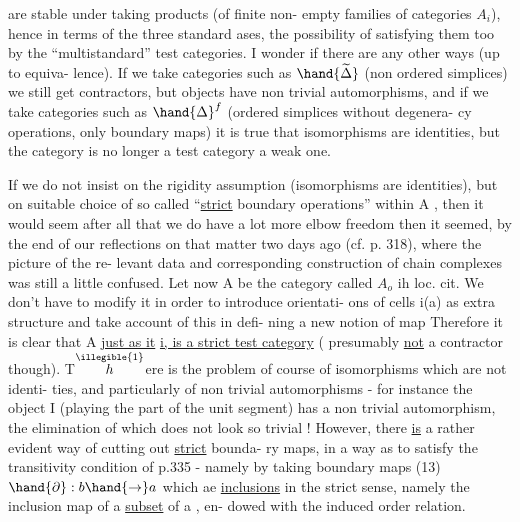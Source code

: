 
 are stable under taking  products (of finite non-%
empty families of categories $A_i$), hence in terms of the three standard
ases, the possibility of satisfying them too by the ``multistandard''
test categories. I wonder if there are any other ways (up to equiva-%
lence). If we take categories such as $\hand{\widetilde{\Delta}}$ (non ordered simplices) we
still get contractors, but objects have non trivial automorphisms, and
if we take categories such as $\hand{\Delta}^{f}$ (ordered simplices without degenera-%
cy operations, only boundary maps) it is true that isomorphisms are
identities, but the category is no longer a test category  a
weak one.

If we do not insist on the rigidity assumption (isomorphisms are
identities), but on suitable choice of so called ``\uline{strict} boundary
operations'' within A , then it would seem after all that we do have
a lot more elbow freedom then it seemed, by the end of our reflections
on that matter two days ago (cf. p. 318), where the picture of the re-%
levant data and corresponding  construction of chain complexes
was still a little confused. Let now A be the category called $A_o$ ih
loc. cit. We don't have to modify it in order to introduce orientati-%
ons of cells i(a) as extra structure and take account of this in defi-%
ning  a new notion of map Therefore it is clear that A \uline{just as it}
\uline{i, is a strict test category} ( presumably \uline{not} a contractor though).
T$\overset{\illegible{1}}{h}$ere is the problem of course of isomorphisms which are not identi-%
ties, and particularly of non trivial automorphisms - for instance
the object I (playing the part of the unit segment) has a non trivial
automorphism, the elimination of which does not look so trivial !
However, there \uline{is} a rather evident way of cutting out \uline{strict} bounda-%
ry maps, in a way as to satisfy the transitivity condition of p.335
- namely by taking boundary maps (13) $\hand{\partial}: b \hand{\to} a$ which ae \uline{inclusions}
in the strict sense, namely the inclusion map of a \uline{subset} of a , en-%
dowed with the induced order relation.

